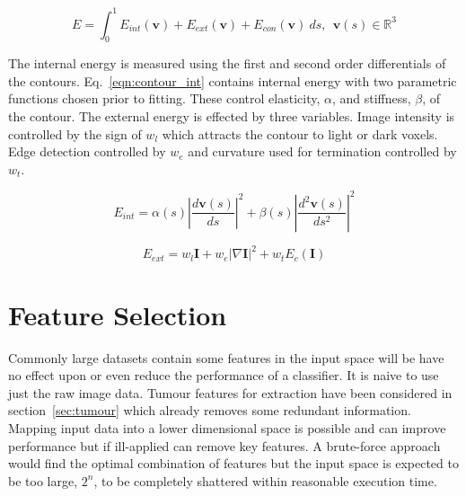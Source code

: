 \documentclass[journal]{IEEEtran}
\begin{document}
\begin{equation}
	E = \int_0^{1} E_{int}(\mathbf{v}) + E_{ext}(\mathbf{v}) + E_{con}(\mathbf{v})\:ds,\:\:\mathbf{v}(s) \in \mathbb{R}^3
	\label{eqn:contour_v}
\end{equation}

The internal energy is measured using the first and second order differentials of the contours.
Eq.~\eqref{eqn:contour_int} contains internal energy with two parametric functions chosen prior to fitting.
These control elasticity, $\alpha$, and stiffness, $\beta$, of the contour.
The external energy is effected by three variables.
Image intensity is controlled by the sign of $w_l$ which attracts the contour to light or dark voxels.
Edge detection controlled by $w_e$ and curvature used for termination controlled by $w_t$. 

\begin{equation}
	 E_{int}= \alpha(s)\left|\frac{d\mathbf{v}(s)}{ds}\right|^2 + \beta(s)\left|\frac{d^2\mathbf{v}(s)}{ds^2}\right|^2 
	 \label{eqn:contour_int}
\end{equation}

\begin{equation}
	 E_{ext}= w_{l}\mathbf{I} + w_{e}|\nabla \mathbf{I}|^2 + w_{t}E_c(\mathbf{I})
	 \label{eqn:contour_int}
\end{equation}















\section{Feature Selection}
\label{sec:selection}

Commonly large datasets contain some features in the input space will be have no effect upon or even reduce the performance of a classifier.
It is naive to use just the raw image data.
Tumour features for extraction have been considered in section~\ref{sec:tumour} which already removes some redundant information. 
Mapping input data into a lower dimensional space is possible and can improve performance but if ill-applied can remove key features.
A brute-force approach would find the optimal combination of features but the input space is expected to be too large, $2^n$, to be completely shattered within reasonable execution time. 
\end{document}
